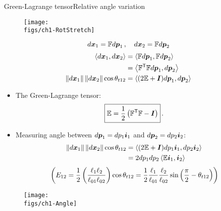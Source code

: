 \begin{frame}{Green-Lagrange tensor}{Relative angle variation}

\begin{overprint}


\begin{figure}
\centering\texttt{[image: \\figs/ch1-RotStretch]}
\end{figure}
\begin{displaymath}
d{\boldsymbol{x}}_1={\mathbb F}d{\boldsymbol{p}}_1\,,\quad d{\boldsymbol{x}}_2={\mathbb F}d{\boldsymbol{p}}_2 \\
\end{displaymath}
\begin{displaymath}
\begin{split}
\left\langle{d{\boldsymbol{x}}_1,d{\boldsymbol{x}}_2}\right\rangle &=\left\langle{{\mathbb F}d{\boldsymbol{p}}_1,{\mathbb F}d{\boldsymbol{p}}_2}\right\rangle \\
&=\left\langle{{\mathbb F}^{\sf T}{\mathbb F}d{\boldsymbol{p}}_1,d{\boldsymbol{p}}_2}\right\rangle \\
\left\|d{\boldsymbol{x}}_1\right\|\left\|d{\boldsymbol{x}}_2\right\|\cos\theta_{t12} &=\left\langle{(2{\mathbb{E}}+{\boldsymbol I})d{\boldsymbol{p}}_1,d{\boldsymbol{p}}_2}\right\rangle
\end{split}
\end{displaymath}


\begin{itemize}
\item The Green-Lagrange tensor:
\begin{displaymath}
\boxed{{\mathbb{E}}=\frac{1}{2}\left({\mathbb F}^{\sf T}{\mathbb F}-{\boldsymbol I}\right)}\,.
\end{displaymath}
\item Measuring angle between $d{\boldsymbol{p}}_1=dp_1{\boldsymbol{i}}_1$ and $d{\boldsymbol{p}}_2=dp_2{\boldsymbol{i}}_2$:
\begin{displaymath}
\begin{split}
\left\|d{\boldsymbol{x}}_1\right\|\left\|d{\boldsymbol{x}}_2\right\|\cos\theta_{t12} &=\left\langle{(2{\mathbb{E}}+{\boldsymbol I})dp_1{\boldsymbol{i}}_1,dp_2{\boldsymbol{i}}_2}\right\rangle \\
&=2dp_1dp_2\left\langle{{\mathbb{E}}{\boldsymbol{i}}_1,{\boldsymbol{i}}_2}\right\rangle
\end{split}
\end{displaymath}
\begin{displaymath}
\left(E_{12}=\frac{1}{2}\left(\frac{\ell_1\ell_2}{\ell_{01}\ell_{02}}\right)\cos\theta_{t12}=\frac{1}{2}\frac{\ell_1}{\ell_{01}}\frac{\ell_2}{\ell_{02}}\sin\left(\frac{\pi}{2}-\theta_{t12}\right)\right)
\end{displaymath}
\end{itemize}
\vskip-10pt
\begin{figure}
\centering\texttt{[image: \\figs/ch1-Angle]}
\end{figure}

\end{overprint}

\end{frame}

